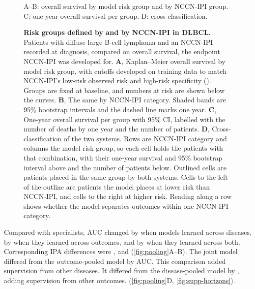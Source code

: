 \begin{figure}[H]
    {A--B: overall survival by model risk group and by NCCN-IPI group. C:
    one-year overall survival per group. D: cross-classification.}
  \caption{\textbf{Risk groups defined by \opera{} and by NCCN-IPI in
  DLBCL.} Patients with diffuse large B-cell lymphoma and an NCCN-IPI recorded at
  diagnosis, compared on overall survival, the endpoint NCCN-IPI was developed for. \textbf{A}, Kaplan--Meier overall survival by model risk group, with cutoffs developed on training
  data to match NCCN-IPI's low-risk observed risk and high-risk specificity
  (). Groups are fixed at baseline, and numbers at risk are shown below the curves. \textbf{B}, The same by NCCN-IPI category. Shaded bands
  are 95\% bootstrap intervals and the dashed line marks one year. \textbf{C},
  One-year overall survival per group with 95\% CI, labelled with the number of deaths by one year and the number of patients.
  \textbf{D}, Cross-classification of the two systems. Rows are NCCN-IPI
  category and columns the model risk group, so each cell holds the patients
  with that combination, with their one-year survival and 95\% bootstrap
  interval above and the number of patients below. Outlined cells are patients
  placed in the same group by both systems. Cells to the left of the outline
  are patients the model places at lower risk than NCCN-IPI, and cells to the
  right at higher risk. Reading along a row shows whether the model separates
  outcomes within one NCCN-IPI category.}
  \label{fig:risk-groups}
\end{figure}

\FloatBarrier
{}
 Compared with specialists, AUC
changed by  when models learned across diseases, by
 when they learned across outcomes, and by
 when they learned across both. Corresponding IPA differences
were ,  and 
(\cref{fig:pooling}A--B). The joint model differed from the outcome-pooled model by
 AUC. This comparison added supervision from other diseases.
It differed from the disease-pooled model by , adding
supervision from other outcomes.
(\cref{fig:pooling}D, \cref{fig:supp-horizons}).

